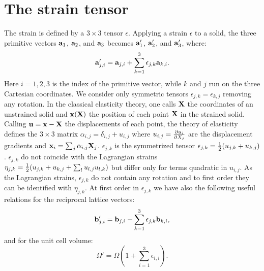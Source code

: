 \documentclass[12pt,a4paper]{article}
\begin{document}
\newpage

\section{\color{coral}The strain tensor}
The strain is defined by a $3\times 3$ tensor
$\epsilon$. Applying a strain $\epsilon$ to a solid, 
the three primitive vectors ${\bf a}_1$, ${\bf a}_2$, and ${\bf a}_3$
becomes 
${\bf a}'_1$, ${\bf a}'_2$, and ${\bf a}'_3$, where:
\begin{equation}
{\bf a}'_{j,i} = {\bf a}_{j,i} +  \sum_{k=1}^3 \epsilon_{j,k} {\bf a}_{k,i}.
\label{strain_def}
\end{equation}
Here $i=1,2,3$ is the index of the primitive vector, while $k$ and $j$ run
on the three Cartesian coordinates. We consider only symmetric tensors
$\epsilon_{j,k}=\epsilon_{k,j}$ removing any rotation. 
In the classical elasticity theory, one
calls ${\bf X}$ the coordinates of an unstrained solid and
${\bf x}({\bf X})$ the position of each point ${\bf X}$ in
the strained solid. Calling ${\bf u}= {\bf x} -{\bf X}$ the displacements
of each point, the theory of elasticity defines the $3\times3$ matrix
$\alpha_{i,j}=\delta_{i,j}+u_{i,j}$ where $u_{i,j}= {\partial u_i \over 
\partial X_j}$ are the displacement gradients and 
${\bf x}_i = \sum_j\alpha_{i,j} {\bf X}_j$. $\epsilon_{j,k}$
is the symmetrized tensor $\epsilon_{j,k}={1\over 2} ( u_{j,k} +
u_{k,j})$. $\epsilon_{j,k}$ do not coincide with the Lagrangian strains
$\eta_{j,k}={1\over 2} ( u_{j,k} + u_{k,j} + \sum_l u_{l,j}u_{l,k})$ but 
differ only for terms quadratic in $u_{i,j}$. As the Lagrangian strains, 
$\epsilon_{j,k}$ do not contain any rotation and to first order they can 
be identified with $\eta_{j,k}$. At first order in $\epsilon_{j,k}$ we have
also the following useful relations for the reciprocal lattice vectors:
\begin{equation}
{\bf b}'_{j,i} = {\bf b}_{j,i} -  \sum_{k=1}^3 \epsilon_{j,k} {\bf b}_{k,i},
\end{equation}
and for the unit cell volume:
\begin{equation}
\Omega'=\Omega \left( 1+\sum_{i=1}^3 \epsilon_{i,i} \right).
\end{equation}
\end{document}
